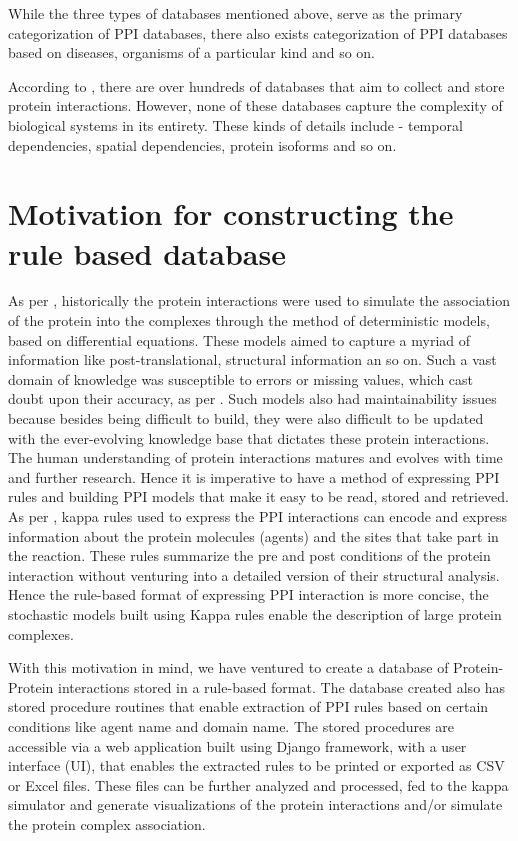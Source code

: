 \documentclass[msc,deptreport,ai]{infthesis}      %
\begin{document}
While the three types of databases mentioned above, serve as the primary categorization of PPI databases, there also exists categorization of PPI databases based on diseases, organisms of a particular kind and so on.

According to \cite{typesOfPPIdb}, there are over hundreds of databases that aim to collect and store protein interactions. However, none of these databases capture the complexity of biological systems in its entirety. These kinds of details include - temporal dependencies, spatial dependencies, protein isoforms and so on.

\section{Motivation for constructing the rule based database}
As per \cite{kappaPlatform}, historically the protein interactions were used to simulate the association of the protein into the complexes through the method of deterministic models,  based on differential equations. These models aimed to capture a myriad of information like post-translational, structural information an so on. Such a vast domain of knowledge was susceptible to errors or missing values, which cast doubt upon their accuracy, as per \cite{kappaPlatform}. Such models also had maintainability issues because besides being difficult to build, they were also difficult to be updated with the ever-evolving knowledge base that dictates these protein interactions. The human understanding of protein interactions matures and evolves with time and further research. Hence it is imperative to have a method of expressing PPI rules and building PPI models that make it easy to be read, stored and retrieved. As per \cite{kappaPlatform}, kappa rules used to express the PPI interactions can encode and express information about the protein molecules (agents) and the sites that take part in the reaction. These rules summarize the pre and post conditions of the protein interaction without venturing into a detailed version of their structural analysis. Hence the rule-based format of expressing PPI interaction is more concise, the stochastic models built using Kappa rules enable the description of large protein complexes.

With this motivation in mind, we have ventured to create a database of Protein-Protein interactions stored in a rule-based format. The database created also has stored procedure routines that enable extraction of PPI rules based on certain conditions like agent name and domain name. The stored procedures are accessible via a web application built using Django framework, with a user interface (UI), that enables the extracted rules to be printed or exported as CSV or Excel files. These files can be further analyzed and processed, fed to the kappa simulator \cite{kasim} and generate visualizations of the protein interactions and/or simulate the protein complex association.
\end{document}
